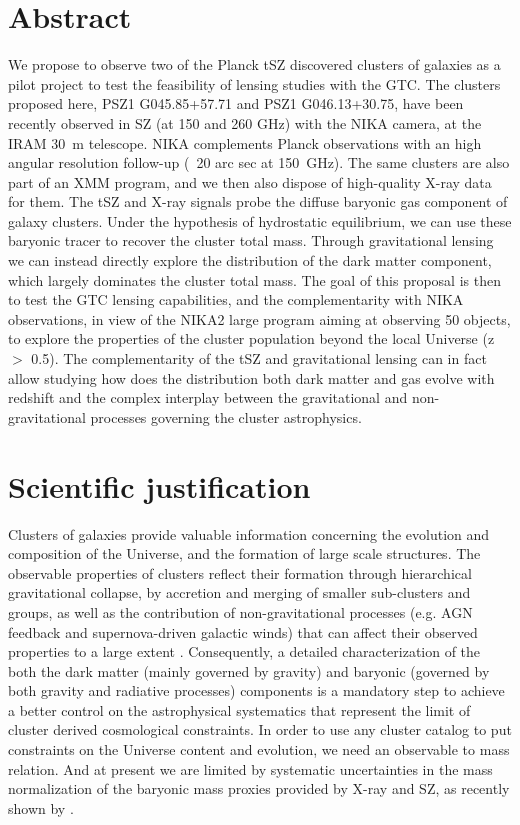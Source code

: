 \documentclass[11pt,a4paper,twoside,graphicx,color]{article}
\begin{document}
\section{Abstract}
We propose to observe two of the Planck tSZ discovered clusters of galaxies as a pilot project to test the feasibility of lensing studies with the GTC.
The clusters proposed here, PSZ1 G045.85+57.71 and PSZ1 G046.13+30.75, have been recently observed in SZ (at 150 and 260 GHz) with the NIKA camera, at the IRAM 30~m telescope. NIKA complements Planck observations with an high angular resolution follow-up (~20 arc sec at 150~GHz). The same clusters are also part of an XMM program, and we then also dispose of high-quality X-ray data for them. The tSZ and X-ray signals probe the diffuse baryonic gas component of galaxy clusters. Under the hypothesis of hydrostatic equilibrium, we can use these baryonic tracer to recover the cluster total mass. Through gravitational lensing we can instead directly explore the distribution of the dark matter component, which largely dominates the cluster total mass. The goal of this proposal is then to test the GTC lensing capabilities, and the complementarity with NIKA observations, in view of the NIKA2 large program aiming at observing 50 objects, to explore the properties of the cluster population beyond the local Universe (z $>$ 0.5). The complementarity of the tSZ and gravitational lensing can in fact allow studying how does the distribution both dark matter and gas evolve with redshift and the complex interplay between the gravitational and non-gravitational processes governing the cluster astrophysics.

\section{Scientific justification}

Clusters of galaxies provide valuable information concerning the evolution and composition of the Universe, and the formation of large scale structures. The observable properties of clusters reflect their formation through hierarchical gravitational collapse, by accretion and merging of smaller sub-clusters and groups, as well as the contribution of non-gravitational processes (e.g. AGN feedback and supernova-driven galactic winds) that can affect their observed properties to a large extent \citep[e.g.][]{sembolini2014}. Consequently, a detailed characterization of the both the dark matter (mainly governed by gravity) and baryonic  (governed by both gravity and radiative processes) components is a mandatory step to achieve a better control on the astrophysical systematics that represent the limit of cluster derived cosmological constraints. In order to use any cluster catalog to put constraints on the Universe content and evolution, we need an observable to mass relation. And at present we are limited by systematic uncertainties in the mass normalization of the baryonic mass proxies provided by X-ray and SZ, as recently shown by \cite{planck_nc_2015}. 
\end{document}
